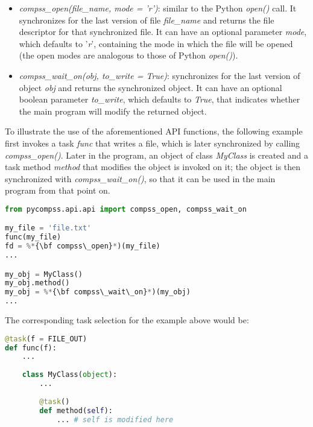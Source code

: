 \begin{itemize}
 \item {\it compss\_open(file\_name, mode = 'r')}: similar to the Python {\it open()} call. It synchronizes
       for the last version of file {\it file\_name} and returns the file descriptor for that synchronized
       file. It can have an optional parameter {\it mode}, which defaults to '{\it r}', containing the
       mode in which the file will be opened (the open modes are analogous to those of
       Python {\it open()}).
 \item {\it compss\_wait\_on(obj, to\_write = True)}: synchronizes for the last version of object {\it obj}
       and returns the synchronized object. It can have an optional boolean parameter
       {\it to\_write}, which defaults to {\it True}, that indicates whether the main program will modify the
       returned object.
\end{itemize}

To illustrate the use of the aforementioned API functions, the following example first invokes a task 
{\it func} that writes a file, which is later synchronized by calling {\it compss\_open()}. 
Later in the program, an object of class {\it MyClass} is created and a task method {\it method} 
that modifies the object is invoked on it; the object is then synchronized with {\it compss\_wait\_on()}, 
so that it can be used in the main program from that point on.

\begin{lstlisting}[language=python]
from pycompss.api.api import compss_open, compss_wait_on

my_file = 'file.txt'
func(my_file)
fd = %*{\bf compss\_open}*)(my_file)
...

my_obj = MyClass()
my_obj.method()
my_obj = %*{\bf compss\_wait\_on}*)(my_obj)
...
\end{lstlisting}

The corresponding task selection for the example above would be:

\begin{lstlisting}[language=python]
@task(f = FILE_OUT)
def func(f):
    ...
    
    class MyClass(object):
        ...
        
        @task()
        def method(self):
            ... # self is modified here
\end{lstlisting}

